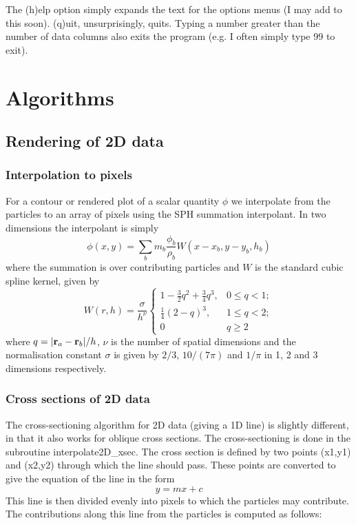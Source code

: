 \documentclass[a4paper,11pt]{article}
\begin{document}
The (h)elp option simply expands the text for the options menus (I
may add to this soon). (q)uit, unsurprisingly, quits. Typing a number greater than the number of
data columns also exits the program (e.g. I often simply type 99 to exit).

\section{Algorithms}

\subsection{Rendering of 2D data}
\subsubsection{Interpolation to pixels}
 For a contour or rendered plot of a scalar quantity $\phi$ we
interpolate from the particles to an array of pixels using the SPH summation
interpolant. In two dimensions the interpolant is simply
\begin{equation}
\phi(x,y) = \sum_b m_b \frac{\phi_b}{\rho_b} W(x - x_b, y-y_b, h_b)
\end{equation}
where the summation is over contributing particles and $W$ is the standard cubic spline kernel, given by
\begin{equation}
W(r,h) = \frac{\sigma}{h^\nu}\left\{ \begin{array}{ll}
1 - \frac{3}{2}q^2 + \frac{3}{4}q^3, & 0 \le q < 1; \\
\frac{1}{4}(2-q)^3, & 1 \le q < 2; \\
0 & q \ge 2 \end{array} \right. \label{eq:cubicspline}
\end{equation}
where $q = \vert {\bf r}_a - {\bf r}_b \vert / h$, $\nu$ is the number of spatial
dimensions and the normalisation constant $\sigma$ is given by $2/3$, $10/(7\pi)$ and $1/\pi$ in
1, 2 and 3 dimensions respectively.

\subsubsection{Cross sections of 2D data}
The cross-sectioning algorithm for 2D data (giving a 1D line) is slightly
different, in that it also works for oblique cross sections. The
cross-sectioning is done in the subroutine interpolate2D\_xsec. The cross
section is defined by two points (x1,y1) and (x2,y2) through which the line
should pass. These points are converted to give the equation of the line in the
form
\begin{equation}
y = mx + c
\end{equation}
This line is then divided evenly into pixels to which the particles
may contribute. The contributions along this line from the particles is computed
as follows: 
\end{document}
